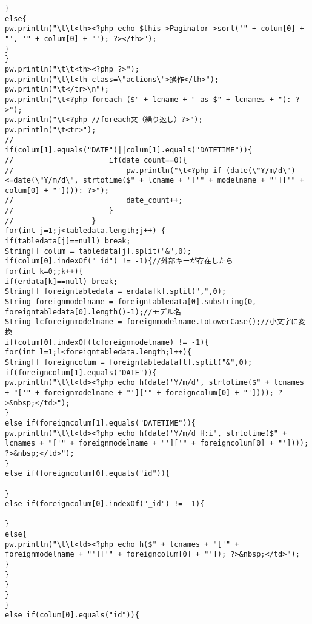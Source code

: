 \documentclass{funthesis}
\begin{document}
\begin{lstlisting}[caption=WriteView.java,label=1]
}
else{
pw.println("\t\t<th><?php echo $this->Paginator->sort('" + colum[0] + "', '" + colum[0] + "'); ?></th>");
}
}
pw.println("\t\t<th><?php ?>");
pw.println("\t\t<th class=\"actions\">操作</th>");
pw.println("\t</tr>\n");
pw.println("\t<?php foreach ($" + lcname + " as $" + lcnames + "): ?>");
pw.println("\t<?php //foreach文（繰り返し）?>");
pw.println("\t<tr>");
//					if(colum[1].equals("DATE")||colum[1].equals("DATETIME")){
//						if(date_count==0){
//							pw.println("\t<?php if (date(\"Y/m/d\")<=date(\"Y/m/d\", strtotime($" + lcname + "['" + modelname + "']['" + colum[0] + "']))): ?>");
//							date_count++;
//						}
//					}
for(int j=1;j<tabledata.length;j++) {
if(tabledata[j]==null) break;
String[] colum = tabledata[j].split("&",0);
if(colum[0].indexOf("_id") != -1){//外部キーが存在したら
for(int k=0;;k++){
if(erdata[k]==null) break;
String[] foreigntabledata = erdata[k].split(",",0);
String foreignmodelname = foreigntabledata[0].substring(0, foreigntabledata[0].length()-1);//モデル名
String lcforeignmodelname = foreignmodelname.toLowerCase();//小文字に変換
if(colum[0].indexOf(lcforeignmodelname) != -1){
for(int l=1;l<foreigntabledata.length;l++){
String[] foreigncolum = foreigntabledata[l].split("&",0);
if(foreigncolum[1].equals("DATE")){
pw.println("\t\t<td><?php echo h(date('Y/m/d', strtotime($" + lcnames + "['" + foreignmodelname + "']['" + foreigncolum[0] + "']))); ?>&nbsp;</td>");
}
else if(foreigncolum[1].equals("DATETIME")){
pw.println("\t\t<td><?php echo h(date('Y/m/d H:i', strtotime($" + lcnames + "['" + foreignmodelname + "']['" + foreigncolum[0] + "']))); ?>&nbsp;</td>");
}
else if(foreigncolum[0].equals("id")){

}
else if(foreigncolum[0].indexOf("_id") != -1){

}
else{
pw.println("\t\t<td><?php echo h($" + lcnames + "['" + foreignmodelname + "']['" + foreigncolum[0] + "']); ?>&nbsp;</td>");
}
}
}
}
}
else if(colum[0].equals("id")){


\end{lstlisting}
\end{document}
